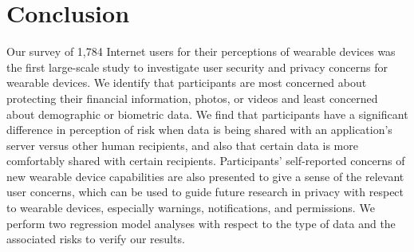 
\section{Conclusion}

Our survey of 1,784 Internet users for their perceptions of wearable devices was the first large-scale study to investigate user security and privacy concerns for wearable devices. We identify that participants are most concerned about protecting their financial information, photos, or videos and least concerned about demographic or biometric data. We find that participants have a significant difference in perception of risk when data is being shared with an application's server versus other human recipients, and also that certain data is more comfortably shared with certain recipients. Participants' self-reported concerns of new wearable device capabilities are also presented to give a sense of the relevant user concerns, which can be used to guide future research in privacy with respect to wearable devices, especially warnings, notifications, and permissions. We perform two regression model analyses with respect to the type of data and the associated risks to verify our results.



